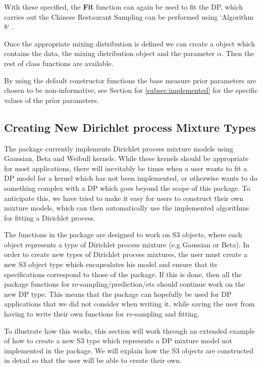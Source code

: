 \documentclass[nojss]{jss}
\begin{document}
With these specified, the \textbf{Fit} function can again be used to fit the DP, which carries out the Chinese Restaurant Sampling can be performed using `Algorithm 8` \citep{neal_markov_2000}.

Once the appropriate mixing distribution is defined we can create a  object which contains the data, the mixing distribution object and the parameter $\alpha$. Then the rest of  class functions are available.

By using the default constructor functions  the base measure prior parameters are chosen to be non-informative, see Section for \ref{subsec:implemented} for the specific values of the prior parameters.

\subsection{Creating New Dirichlet process Mixture Types} \label{sec:NewMDobj}
The  package currently implements Dirichlet process mixture models using Gaussian, Beta and Weibull kernels. While these kernels should be appropriate for most applications, there will inevitably be times when a user wants to fit a DP model for a kernel which has not been implemented, or otherwise wants to do something complex with a DP which goes beyond the scope of this package. To anticipate this, we have tried to make it easy for users to construct their own mixture models, which can then automatically use the implemented algorithms for fitting a Dirichlet process.

The functions in the package are designed to work on S3  objects, where each object represents a type of Dirichlet process mixture (e.g Gaussian or Beta). In order to create new types of Dirichlet process mixtures, the user must create a new S3 object type which encapsulates his model and ensure that its specifications correspond to those of the package. If this is done, then all the package functions for re-sampling/prediction/etc should continue work on the new DP type. This means that the package can hopefully be used for DP applications that we did not consider when writing it, while saving the user from having to write their own functions for re-sampling and fitting.

To illustrate how this works, this section will work through an extended example of how to create a new S3 type which represents a DP mixture model not implemented in the  package. We will explain how the S3 objects are constructed in detail so that the user will be able to create their own.
\end{document}
